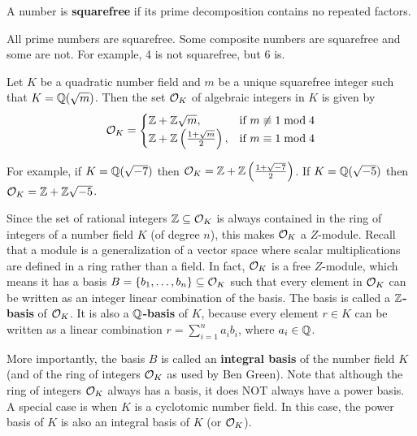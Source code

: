 \documentclass[../main.tex]{subfiles}
\begin{document}
\begin{definition}
\reversemarginpar
{}
A number is \textbf{squarefree} if its prime decomposition contains no repeated factors. 
\end{definition}
All prime numbers are squarefree. Some composite numbers are squarefree and some are not. For example, 4 is not squarefree, but 6 is. 

\begin{theorem}
\label{app thm:roiQuadField}
\reversemarginpar
{}
\label{app thm:OKQuadField}
Let $K$ be a quadratic number field and $m$ be a unique squarefree integer such that $K=\mathbb{Q}(\sqrt{m})$. Then the set $\mathcal{O}_K$ of algebraic integers in $K$ is given by 
\begin{equation*}
    \mathcal{O}_K = 
    \begin{cases}
      \mathbb{Z} + \mathbb{Z}\sqrt{m}, & \text{if $m \not\equiv 1 \bmod 4$} \\
      \mathbb{Z} + \mathbb{Z}\left( \frac{1+\sqrt{m}}{2}\right), & \text{if $m \equiv 1 \bmod 4$}
    \end{cases}
\end{equation*}
\end{theorem}

For example, if $K=\mathbb{Q}(\sqrt{-7})$ then $\mathcal{O}_K = \mathbb{Z}+\mathbb{Z}\left(\frac{1+\sqrt{-7}}{2} \right)$. 
If  $K=\mathbb{Q}(\sqrt{-5})$ then $\mathcal{O}_K = \mathbb{Z} + \mathbb{Z} \sqrt{-5}$.


Since the set of rational integers $\mathbb{Z} \subseteq \mathcal{O}_K$ is always contained in the ring of integers of a number field $K$ (of degree $n$), this makes $\mathcal{O}_K$ a $Z$-module. Recall that a module is a generalization of a vector space where scalar multiplications are defined in a ring rather than a field. 
\reversemarginpar
{}
In fact, $\mathcal{O}_K$ is a free $Z$-module, which means it has a basis $B=\{b_1, \dots, b_n\} \subseteq \mathcal{O}_K$ such that every element in $\mathcal{O}_K$ can be written as an integer linear combination of the basis. 
The basis is called a \textbf{$\mathbb{Z}$-basis} of $\mathcal{O}_K$. It is also a \textbf{$\mathbb{Q}$-basis} of $K$, because every element $r \in K$ can be written as a linear combination $r=\sum_{i=1}^n a_i b_i$, where $a_i \in \mathbb{Q}$.  

More importantly, the basis $B$ is called an \textbf{integral basis} 
\reversemarginpar
{}
of the number field $K$ (and of the ring of integers $\mathcal{O}_K$ as used by Ben Green).
Note that although the ring of integers $\mathcal{O}_K$ always has a basis, it does NOT always have a power basis. A special case is when $K$ is a cyclotomic number field. In this case, the power basis of $K$ is also an integral basis of $K$ (or $\mathcal{O}_K$). 
\end{document}
